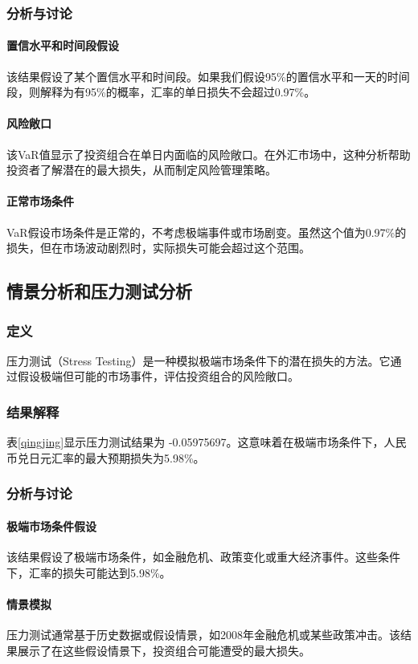 \subsubsection{分析与讨论}
\paragraph{置信水平和时间段假设}该结果假设了某个置信水平和时间段。如果我们假设95\%的置信水平和一天的时间段，则解释为有95\%的概率，汇率的单日损失不会超过0.97\%。
\paragraph{风险敞口}该VaR值显示了投资组合在单日内面临的风险敞口。在外汇市场中，这种分析帮助投资者了解潜在的最大损失，从而制定风险管理策略。
\paragraph{正常市场条件}VaR假设市场条件是正常的，不考虑极端事件或市场剧变。虽然这个值为0.97\%的损失，但在市场波动剧烈时，实际损失可能会超过这个范围。

\subsection{情景分析和压力测试分析}
\subsubsection{定义}
压力测试（Stress Testing）是一种模拟极端市场条件下的潜在损失的方法。它通过假设极端但可能的市场事件，评估投资组合的风险敞口。

\subsubsection{结果解释}
表\ref{qingjing}显示压力测试结果为 -0.05975697。这意味着在极端市场条件下，人民币兑日元汇率的最大预期损失为5.98\%。

\subsubsection{分析与讨论}
\paragraph{极端市场条件假设}该结果假设了极端市场条件，如金融危机、政策变化或重大经济事件。这些条件下，汇率的损失可能达到5.98\%。
\paragraph{情景模拟}压力测试通常基于历史数据或假设情景，如2008年金融危机或某些政策冲击。该结果展示了在这些假设情景下，投资组合可能遭受的最大损失。
